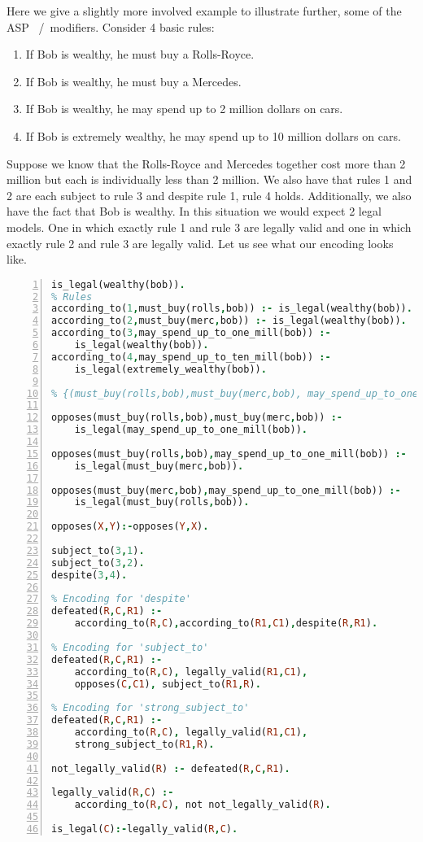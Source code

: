 Here we give a slightly more involved example to illustrate further, some of the ASP  ~/~modifiers.
Consider 4 basic rules:
\begin{enumerate}
  \item If Bob is wealthy, he must buy a Rolls-Royce.
  \item If Bob is wealthy, he must buy a Mercedes.
  \item If Bob is wealthy, he may spend up to 2 million dollars on cars.
  \item If Bob is extremely wealthy, he may spend up to 10 million dollars on cars.
\end{enumerate}
Suppose we know that the Rolls-Royce and Mercedes together cost more
than 2 million but each is individually less than 2 million. We also
have that rules 1 and 2 are each subject to rule 3 and despite rule 1,
rule 4 holds. Additionally, we also have the fact that Bob is
wealthy. In this situation we would expect 2 legal models. One in which
exactly rule 1 and rule 3 are legally valid and one in which exactly
rule 2 and rule 3 are legally valid. Let us see what our encoding
looks like.
\begin{lstlisting}[language=Prolog, numbers=left]
is_legal(wealthy(bob)).
% Rules
according_to(1,must_buy(rolls,bob)) :- is_legal(wealthy(bob)).
according_to(2,must_buy(merc,bob)) :- is_legal(wealthy(bob)).
according_to(3,may_spend_up_to_one_mill(bob)) :-
    is_legal(wealthy(bob)).
according_to(4,may_spend_up_to_ten_mill(bob)) :-
    is_legal(extremely_wealthy(bob)).

% {(must_buy(rolls,bob),must_buy(merc,bob), may_spend_up_to_one_mill(bob)} is a min. inconsistent set.

opposes(must_buy(rolls,bob),must_buy(merc,bob)) :-
    is_legal(may_spend_up_to_one_mill(bob)).

opposes(must_buy(rolls,bob),may_spend_up_to_one_mill(bob)) :-
    is_legal(must_buy(merc,bob)).

opposes(must_buy(merc,bob),may_spend_up_to_one_mill(bob)) :-
    is_legal(must_buy(rolls,bob)).

opposes(X,Y):-opposes(Y,X).

subject_to(3,1).
subject_to(3,2).
despite(3,4).

% Encoding for 'despite'
defeated(R,C,R1) :-
    according_to(R,C),according_to(R1,C1),despite(R,R1).

% Encoding for 'subject_to'
defeated(R,C,R1) :-
    according_to(R,C), legally_valid(R1,C1),
    opposes(C,C1), subject_to(R1,R).

% Encoding for 'strong_subject_to'
defeated(R,C,R1) :-
    according_to(R,C), legally_valid(R1,C1),
    strong_subject_to(R1,R).

not_legally_valid(R) :- defeated(R,C,R1).

legally_valid(R,C) :- 
    according_to(R,C), not not_legally_valid(R).

is_legal(C):-legally_valid(R,C).
\end{lstlisting}
